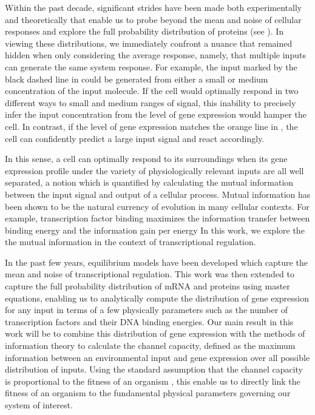 Within the past decade, significant strides have been made both experimentally
and theoretically that enable us to probe beyond the mean and noise of cellular
responses and explore the full probability distribution of proteins (see
\fref[figExpSetup]). In viewing these distributions, we immediately confront a
nuance that remained hidden when only considering the average response, namely,
that multiple inputs can generate the same system response. For example, the
input marked by the black dashed line in \fref[figExpSetup] could be
generated from either a small or medium concentration of the input molecule. If
the cell would optimally respond in two different ways to small and medium
ranges of signal, this inability to precisely infer the input concentration from
the level of gene expression would hamper the cell. In contrast, if the level of
gene expression matches the orange line in \fref[figExpSetup], the
cell can confidently predict a large input signal and react accordingly.

In this sense, a cell can optimally respond to its surroundings when its gene
expression profile under the variety of physiologically relevant inputs are all
well separated, a notion which is quantified by calculating the mutual
information between the input signal and output of a cellular process. Mutual
information has been shown to be the natural currency of evolution in many
cellular contexts. For example, transcription factor binding maximizes the
information transfer between binding energy and the information gain per energy
\cite{Savir2016} In this work, we explore the the mutual information in the
context of transcriptional regulation.

In the past few years, equilibrium models have been developed which capture the
mean \cite{Garcia2011c} and noise \cite{Jones2014a} of transcriptional
regulation. This work was then extended to capture the full probability
distribution of mRNA \cite{Sanchez2013} and proteins \cite{Shahrezaei2008,
	Swain2016} using master equations, enabling us to analytically compute the
distribution of gene expression for any input in terms of a few physically
parameters such as the number of transcription factors and their DNA binding
energies. Our main result in this work will be to combine this distribution of
gene expression with the methods of information theory to calculate the channel
capacity, defined as the maximum information between an environmental input and
gene expression over all possible distribution of inputs. Using the standard
assumption that the channel capacity is proportional to the fitness of an
organism \cite{Tkacik2008a}, this enable us to directly link the fitness of an
organism to the fundamental physical parameters governing our system of
interest.


